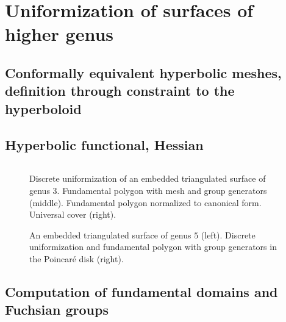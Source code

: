 \documentclass[Thesis.tex]{subfiles}
\begin{document}
\section{Uniformization of surfaces of higher genus}

\subsection{Conformally equivalent hyperbolic meshes, definition through constraint to the hyperboloid}
\subsection{Hyperbolic functional, Hessian}

\begin{equation}
\label{eq:hyperbolic_fuctional}
\end{equation}

\begin{figure}
\centering
{}
\caption{Discrete uniformization of an embedded triangulated surface of genus $3$. Fundamental polygon with mesh and group generators (middle). Fundamental polygon normalized to canonical form. Universal cover (right).}
\label{fig:embedded_genus_3}
\end{figure}

\begin{figure}
\centering
{}
\caption{An embedded triangulated surface of genus $5$ (left). Discrete uniformization and fundamental polygon with  group generators in the Poincar\'e disk (right).}
\label{fig:embedded_genus_5}
\end{figure}





\subsection{Computation of fundamental domains and Fuchsian groups}
\label{sec:fundamental_domains}
\end{document}
